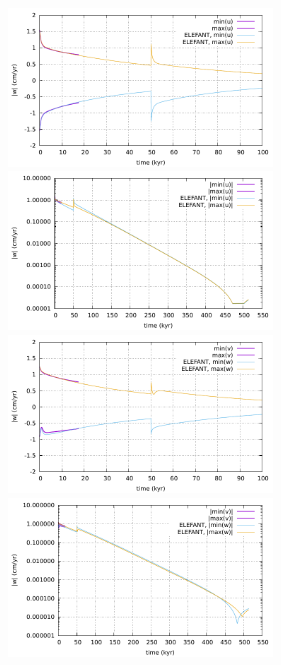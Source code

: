 \begin{center}
\includegraphics[width=7cm]{python_codes/fieldstone_64/results/beam/u.pdf}
\includegraphics[width=7cm]{python_codes/fieldstone_64/results/beam/u_log.pdf}\\
\includegraphics[width=7cm]{python_codes/fieldstone_64/results/beam/v.pdf}
\includegraphics[width=7cm]{python_codes/fieldstone_64/results/beam/v_log.pdf}
\end{center}

